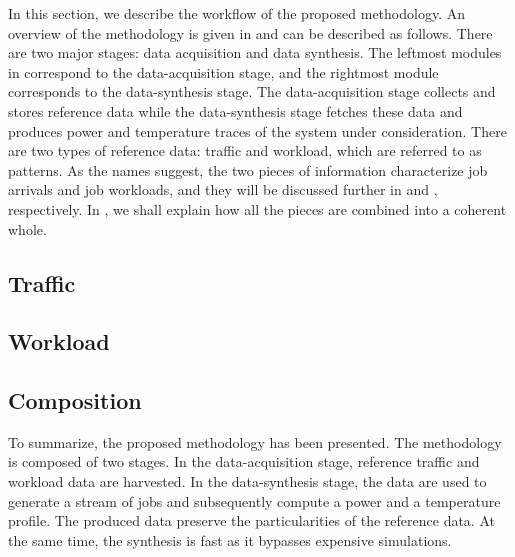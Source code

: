 In this section, we describe the workflow of the proposed methodology. An
overview of the methodology is given in  and can be described
as follows. There are two major stages: data acquisition and data synthesis. The
leftmost modules in  correspond to the data-acquisition stage,
and the rightmost module corresponds to the data-synthesis stage. The
data-acquisition stage collects and stores reference data while the
data-synthesis stage fetches these data and produces power and temperature
traces of the system under consideration. There are two types of reference data:
traffic and workload, which are referred to as patterns. As the names suggest,
the two pieces of information characterize job arrivals and job workloads, and
they will be discussed further in  and ,
respectively. In , we shall explain how all the pieces are
combined into a coherent whole.

\subsection{Traffic} 


\subsection{Workload} 


\subsection{Composition} 


To summarize, the proposed methodology has been presented. The methodology is
composed of two stages. In the data-acquisition stage, reference traffic and
workload data are harvested. In the data-synthesis stage, the data are used to
generate a stream of jobs and subsequently compute a power and a temperature
profile. The produced data preserve the particularities of the reference data.
At the same time, the synthesis is fast as it bypasses expensive simulations.
